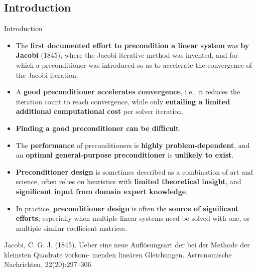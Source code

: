 \documentclass[t,usepdftitle=false]{beamer}
\begin{document}
\subsection{Introduction}
\begin{frame}{Introduction}
\begin{itemize}
\item The \textbf{first documented effort to precondition a linear system} was \textbf{by Jacobi} (1845), where the Jacobi iterative method was invented, and for which a preconditioner was introduced so as to accelerate the convergence of the Jacobi iteration.
\item A \textbf{good preconditioner accelerates convergence}, i.e., it reduces the iteration count to reach convergence, while only \textbf{entailing a limited additional computational cost} per solver iteration.
\item[] \textbf{Finding a good preconditioner can be difficult}.
\item[] The \textbf{performance} of preconditioners is \textbf{highly problem-dependent}, and an \textbf{optimal general-purpose preconditioner} is \textbf{unlikely to exist}.
\item[] \textbf{Preconditioner design} is sometimes described as a combination of art and science, often relies on heuristics with \textbf{limited theoretical insight}, and \textbf{significant input from domain expert knowledge}.
\item[] In practice, \textbf{preconditioner design} is often the \textbf{source of significant efforts}, especially when multiple linear systems need be solved with one, or multiple similar coefficient matrices.
\end{itemize}\smallskip
\tiny{Jacobi, C. G. J. (1845). Ueber eine neue Auflösungsart der bei der Methode der kleinsten Quadrate vorkom-
menden lineären Gleichungen. Astronomische Nachrichten, 22(20):297–306.}
\end{frame}
\end{document}
